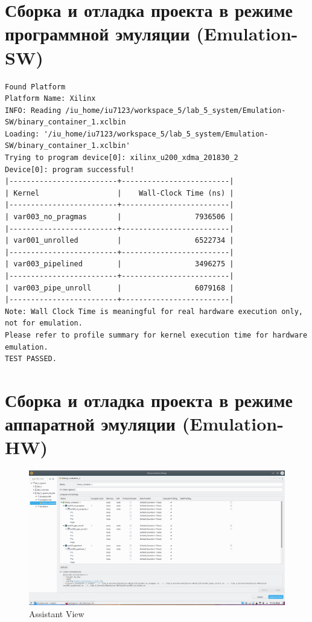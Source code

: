 \clearpage

\lstset{numbers=none}

\chapter{Сборка и отладка проекта в режиме программной
эмуляции (Emulation-SW)}

\begin{lstlisting}[caption=Результат работы программы]
Found Platform
Platform Name: Xilinx
INFO: Reading /iu_home/iu7123/workspace_5/lab_5_system/Emulation-SW/binary_container_1.xclbin
Loading: '/iu_home/iu7123/workspace_5/lab_5_system/Emulation-SW/binary_container_1.xclbin'
Trying to program device[0]: xilinx_u200_xdma_201830_2
Device[0]: program successful!
|-------------------------+-------------------------|
| Kernel                  |    Wall-Clock Time (ns) |
|-------------------------+-------------------------|
| var003_no_pragmas       |                 7936506 |
|-------------------------+-------------------------|
| var001_unrolled         |                 6522734 |
|-------------------------+-------------------------|
| var003_pipelined        |                 3496275 |
|-------------------------+-------------------------|
| var003_pipe_unroll      |                 6079168 |
|-------------------------+-------------------------|
Note: Wall Clock Time is meaningful for real hardware execution only, not for emulation.
Please refer to profile summary for kernel execution time for hardware emulation.
TEST PASSED.
\end{lstlisting}

\chapter{Сборка и отладка проекта в режиме аппаратной
эмуляции (Emulation-HW)}

\begin{figure}[ht]
	\centering
	\includegraphics[width=0.9\linewidth]{img/hw-1}
	\caption{Assistant View}
	\label{fig:hw-1}
\end{figure}

